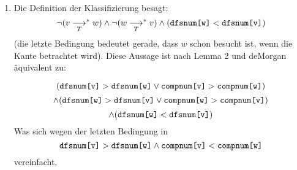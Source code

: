 \documentclass[a4paper]{scrartcl}
\newcommand{\pfad}[1][]{\underset{#1}{\longrightarrow}^*}
\begin{document}
\begin{enumerate}
\item
Die Definition der Klassifizierung besagt:
\[
\lnot(v\pfad[T] w)\land \lnot (w\pfad[T] v) \land (\verb|dfsnum[w]|<\verb|dfsnum[v]|)
\]
(die letzte Bedingung bedeutet gerade, dass $w$ schon besucht ist, wenn die Kante betrachtet wird).
Diese Aussage ist nach Lemma 2 und deMorgan äquivalent zu:

\[
(\verb|dfsnum[v]|>\verb|dfsnum[w]| \lor \verb|compnum[v]|>\verb|compnum[w]|)
\]
\[
\land ( \verb|dfsnum[w]| > \verb|dfsnum[v]| \lor \verb|compnum[w]| > \verb|compnum[v]|)
\]
\[
\land (\verb|dfsnum[w]|<\verb|dfsnum[v]|)
\]
Was sich wegen der letzten Bedingung in
\[
\verb|dfsnum[v]|>\verb|dfsnum[w]| \land \verb|compnum[v]|<\verb|compnum[w]|
\]
vereinfacht.

\end{enumerate}
\end{document}
